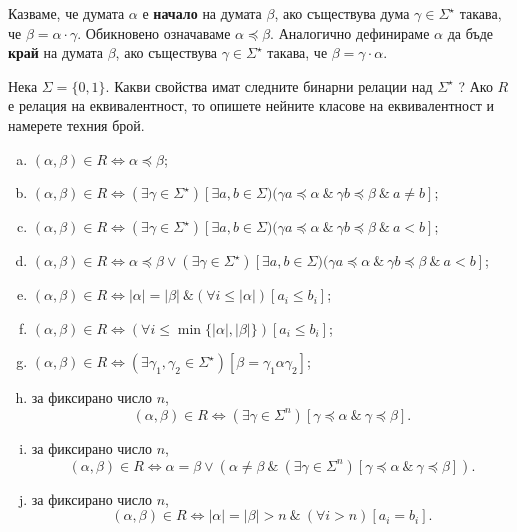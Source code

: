 Казваме, че думата $\alpha$ е {\bf начало} на думата $\beta$, ако съществува дума $\gamma \in \Sigma^\star$ такава, че
$\beta = \alpha\cdot\gamma$. Обикновено означаваме $\alpha \preceq \beta$.
Аналогично дефинираме $\alpha$ да бъде {\bf край} на думата $\beta$, ако съществува $\gamma \in \Sigma^\star$ такава, че
$\beta = \gamma \cdot \alpha$.

\begin{problem}
  Нека $\Sigma = \{0,1\}$.
  Какви свойства имат следните бинарни релации над $\Sigma^\star$ ?
  Ако $R$ е релация на  еквивалентност, то опишете нейните класове на еквивалентност 
  и намерете техния брой.
  \begin{enumerate}[a)]
  \item
    $(\alpha,\beta) \in R \iff \alpha \preceq \beta$;
  \item
    $(\alpha,\beta) \in R  \iff (\exists\gamma\in \Sigma^\star)[\exists a,b\in \Sigma)(\gamma a \preceq \alpha\ \&\ \gamma b \preceq \beta\ \&\ a \neq b]$;
  \item
    $(\alpha,\beta) \in R  \iff (\exists\gamma\in \Sigma^\star)[\exists a,b\in \Sigma)(\gamma a \preceq \alpha\ \&\ \gamma b \preceq \beta\ \&\ a < b]$;
  \item
    $(\alpha,\beta) \in R  \iff \alpha \preceq \beta \vee (\exists\gamma\in \Sigma^\star)[\exists a,b\in \Sigma)(\gamma a \preceq \alpha\ \&\ \gamma b \preceq \beta\ \&\ a < b]$;
  \item
    $(\alpha,\beta) \in R \iff |\alpha| = |\beta|\ \& (\forall i \leq |\alpha|)[a_i \leq b_i]$;
  \item
    $(\alpha,\beta) \in R \iff (\forall i \leq \min\{|\alpha|,|\beta|\})[a_i \leq b_i]$;
  \item
    $(\alpha,\beta) \in R \iff (\exists \gamma_1,\gamma_2 \in \Sigma^\star)[\beta = \gamma_1 \alpha \gamma_2]$;
  \item
    за фиксирано число $n$,
    \[(\alpha,\beta) \in R \iff (\exists\gamma\in\Sigma^n)[\gamma\preceq\alpha\ \&\ \gamma\preceq\beta].\]
  \item
    за фиксирано число $n$,
    \[(\alpha,\beta) \in R \iff \alpha = \beta \vee (\alpha \neq \beta\ \&\ (\exists\gamma\in\Sigma^n)[\gamma\preceq\alpha\ \&\ \gamma\preceq\beta]).\]
  \item
    за фиксирано число $n$,
    \[(\alpha, \beta)\in R \iff |\alpha| = |\beta| > n\ \&\ (\forall i > n)[a_i = b_i].\]
  \end{enumerate}
\end{problem}

